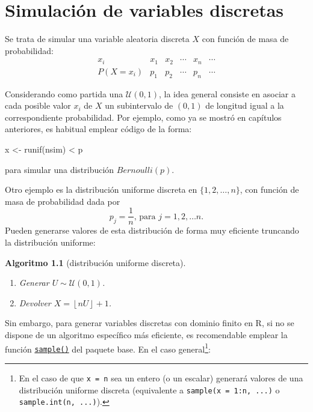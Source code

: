 \documentclass[
]{book}
\newenvironment{Shaded}{\begin{snugshade}}{\end{snugshade}}
\newcommand{\FunctionTok}[1]{\textcolor[rgb]{0.00,0.00,0.00}{#1}}
\newcommand{\NormalTok}[1]{#1}
\newcommand{\OtherTok}[1]{\textcolor[rgb]{0.56,0.35,0.01}{#1}}
\newcommand{\SpecialCharTok}[1]{\textcolor[rgb]{0.00,0.00,0.00}{#1}}
\theoremstyle{break}
\newtheorem{conjecture}{Algoritmo}[chapter]
\theoremstyle{nonumberplain}
\begin{document}
\hypertarget{discretas}{%
\chapter{Simulación de variables discretas}\label{discretas}}

Se trata de simular una variable aleatoria discreta \(X\) con función de masa de
probabilidad:
\[\begin{array}{l|ccccc}
 x_{i}  &  x_{1}  &  x_{2}  &  \cdots   &  x_{n}  &  \cdots   \\ \hline
 P\left( X=x_{i}\right)   &  p_{1}  &  p_{2}  &  \cdots   &  p_{n}  &  
\cdots  
\end{array}\]

Considerando como partida una \(\mathcal{U}\left( 0,1\right)\), la
idea general consiste en asociar a cada posible valor \(x_{i}\) de \(X\)
un subintervalo de \(\left( 0,1\right)\) de longitud igual a la correspondiente
probabilidad.
Por ejemplo, como ya se mostró en capítulos anteriores, es habitual emplear
código de la forma:

\begin{Shaded}
\begin{Highlighting}[]
\NormalTok{x }\OtherTok{\textless{}{-}} \FunctionTok{runif}\NormalTok{(nsim) }\SpecialCharTok{\textless{}}\NormalTok{ p}
\end{Highlighting}
\end{Shaded}

para simular una distribución \(Bernoulli(p)\).

Otro ejemplo es la distribución uniforme discreta
en \(\{1,2,\ldots,n\}\), con función de masa de probabilidad dada por
\[p_{j}=\frac{1}{n}\text{, para }j=1,2,\ldots n.\]
Pueden generarse valores de esta distribución de forma muy eficiente truncando la distribución uniforme:

\begin{conjecture}[distribución uniforme discreta]
\protect\hypertarget{cnj:unif-discr}{}\label{cnj:unif-discr}

\begin{enumerate}
\def\labelenumi{\arabic{enumi}.}
\item
  Generar \(U\sim \mathcal{U}\left( 0,1\right)\).
\item
  Devolver \(X=\left\lfloor nU\right\rfloor + 1\).
\end{enumerate}

\end{conjecture}

Sin embargo, para generar variables discretas con dominio finito en R, si no se dispone de un algoritmo específico más eficiente, es recomendable emplear la función \href{https://rdrr.io/r/base/sample.html}{\texttt{sample()}} del paquete base.
En el caso general\footnote{En el caso de que \texttt{x\ =\ n} sea un entero (o un escalar) generará valores de una distribución uniforme discreta (equivalente a \texttt{sample(x\ =\ 1:n,\ ...)} o \texttt{sample.int(n,\ ...)}).}:
\end{document}

